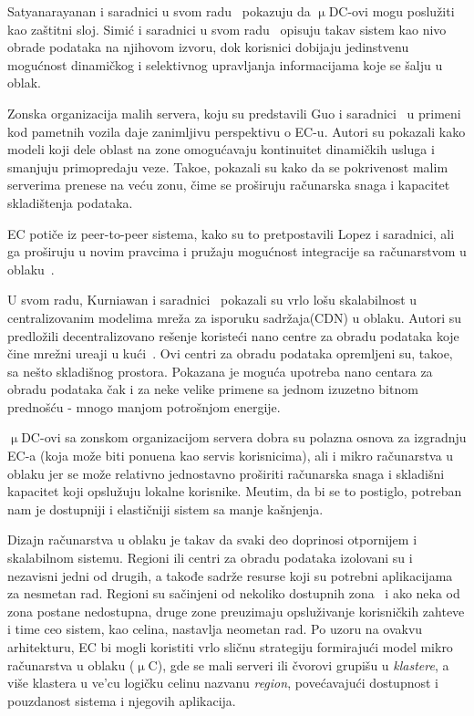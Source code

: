 Satyanarayanan i saradnici u svom radu~\cite{SatyanarayananK19} pokazuju da $\upmu$DC-ovi mogu poslu\v ziti kao za\v stitni sloj. Simi\'c i saradnici u svom radu~\cite{inproceedingsSimic1}  opisuju takav sistem kao nivo obrade podataka na njihovom izvoru, dok korisnici dobijaju jedinstvenu mogu\'cnost dinami\v ckog i selektivnog upravljanja informacijama koje se \v salju u oblak. 

Zonska organizacija malih servera, koju su predstavili Guo i saradnici~\cite{GuoRG20} u primeni kod pametnih vozila daje zanimljivu perspektivu o EC-u. Autori su pokazali kako modeli koji dele oblast na zone omogu\'cavaju kontinuitet dinami\v ckih usluga i smanjuju primopredaju veze. Tako\dj e, pokazali su kako da se pokrivenost malim serverima prenese na ve\'cu zonu, \v cime se pro\v siruju ra\v cunarska snaga i kapacitet skladi\v stenja podataka.

EC poti\v ce iz peer-to-peer sistema, kako su to pretpostavili Lopez i saradnici, ali ga pro\v siruju u novim pravcima i pru\v zaju mogu\'cnost integracije sa ra\v cunarstvom u oblaku~\cite{LopezMEDHIBFR15}.

U svom radu, Kurniawan i saradnici~\cite{inbookKurniawan} pokazali su vrlo lo\v su skalabilnost u centralizovanim modelima mre\v za za isporuku sadr\v zaja(CDN) u oblaku. Autori su predlo\v zili decentralizovano re\v senje koriste\'ci nano centre za obradu podataka koje \v cine mre\v zni ure\dj aji u ku\'ci~\cite{inbookKurniawan}. Ovi centri za obradu podataka opremljeni su, tako\dj e, sa ne\v sto skladi\v snog prostora. Pokazana je mogu\'ca upotreba nano centara za obradu podataka \v cak i za neke velike primene sa jednom izuzetno bitnom predno\v s\'cu - mnogo manjom potro\v snjom energije.

$\upmu$DC-ovi sa zonskom organizacijom servera dobra su polazna osnova za izgradnju EC-a (koja mo\v ze biti ponu\dj ena kao servis korisnicima), ali i mikro ra\v cunarstva u oblaku jer se mo\v ze relativno jednostavno pro\v siriti ra\v cunarska snaga i skladi\v sni kapacitet koji opslu\v zuju lokalne korisnike. Me\dj utim, da bi se to postiglo, potreban nam je dostupniji i elasti\v cniji sistem sa manje ka\v snjenja. 

Dizajn ra\v cunarstva u oblaku je takav da svaki deo doprinosi otpornijem i skalabilnom sistemu. Regioni ili centri za obradu podataka izolovani su i nezavisni jedni od drugih, a takođe sadr\v ze resurse koji su potrebni aplikacijama za nesmetan rad. Regioni su sa\v cinjeni od nekoliko dostupnih zona~\cite{SouzaMFAK19} i ako neka od zona postane nedostupna, druge zone preuzimaju opslu\v zivanje korisni\v ckih zahteve i time ceo sistem, kao celina, nastavlja neometan rad. Po uzoru na ovakvu arhitekturu, EC bi mogli koristiti vrlo sli\v cnu strategiju formiraju\'ci model mikro ra\v cunarstva u oblaku ($\upmu$C), gde se mali serveri ili \v cvorovi grupi\v su u \emph{klastere}, a vi\v se klastera u ve'cu logi\v cku celinu nazvanu \emph{region}, pove\'cavaju\'ci dostupnost i pouzdanost sistema i njegovih aplikacija.

